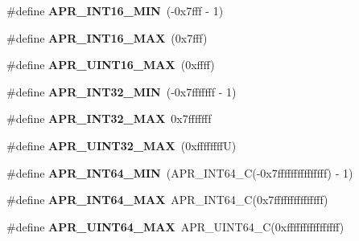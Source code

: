 \begin{DoxyCompactItemize}
\item 
\#define {\bfseries A\+P\+R\+\_\+\+I\+N\+T16\+\_\+\+M\+IN}~(-\/0x7fff -\/ 1)\hypertarget{group__apr__platform_ga93b69f6b2d426b30c991a74f55be5308}{}\label{group__apr__platform_ga93b69f6b2d426b30c991a74f55be5308}

\item 
\#define {\bfseries A\+P\+R\+\_\+\+I\+N\+T16\+\_\+\+M\+AX}~(0x7fff)\hypertarget{group__apr__platform_gac4180108ae7cfe8b7f636183368c89c5}{}\label{group__apr__platform_gac4180108ae7cfe8b7f636183368c89c5}

\item 
\#define {\bfseries A\+P\+R\+\_\+\+U\+I\+N\+T16\+\_\+\+M\+AX}~(0xffff)\hypertarget{group__apr__platform_ga2b7a0eb7506ac0bfc4d711929f9a3a48}{}\label{group__apr__platform_ga2b7a0eb7506ac0bfc4d711929f9a3a48}

\item 
\#define {\bfseries A\+P\+R\+\_\+\+I\+N\+T32\+\_\+\+M\+IN}~(-\/0x7fffffff -\/ 1)\hypertarget{group__apr__platform_gaa99bd633c3478131fa672559601a76e7}{}\label{group__apr__platform_gaa99bd633c3478131fa672559601a76e7}

\item 
\#define {\bfseries A\+P\+R\+\_\+\+I\+N\+T32\+\_\+\+M\+AX}~0x7fffffff\hypertarget{group__apr__platform_ga0966ef0d235765d9fe1b9900fbe04faa}{}\label{group__apr__platform_ga0966ef0d235765d9fe1b9900fbe04faa}

\item 
\#define {\bfseries A\+P\+R\+\_\+\+U\+I\+N\+T32\+\_\+\+M\+AX}~(0xffffffff\+U)\hypertarget{group__apr__platform_ga239c26656c361f627f7db619997abaac}{}\label{group__apr__platform_ga239c26656c361f627f7db619997abaac}

\item 
\#define {\bfseries A\+P\+R\+\_\+\+I\+N\+T64\+\_\+\+M\+IN}~(A\+P\+R\+\_\+\+I\+N\+T64\+\_\+C(-\/0x7fffffffffffffff) -\/ 1)\hypertarget{group__apr__platform_gaf371ae92dbf0fed20801cf279cd85f1a}{}\label{group__apr__platform_gaf371ae92dbf0fed20801cf279cd85f1a}

\item 
\#define {\bfseries A\+P\+R\+\_\+\+I\+N\+T64\+\_\+\+M\+AX}~A\+P\+R\+\_\+\+I\+N\+T64\+\_\+C(0x7fffffffffffffff)\hypertarget{group__apr__platform_ga3b25669924dcfa853cd6ea3395c8717f}{}\label{group__apr__platform_ga3b25669924dcfa853cd6ea3395c8717f}

\item 
\#define {\bfseries A\+P\+R\+\_\+\+U\+I\+N\+T64\+\_\+\+M\+AX}~A\+P\+R\+\_\+\+U\+I\+N\+T64\+\_\+C(0xffffffffffffffff)\hypertarget{group__apr__platform_ga2d20379176b15b8b0598992df3def796}{}\label{group__apr__platform_ga2d20379176b15b8b0598992df3def796}


\end{DoxyCompactItemize}
